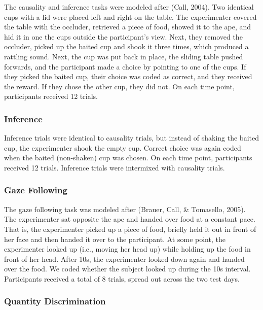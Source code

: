 \documentclass[10pt, letterpaper]{article}
\begin{document}
The causality and inference tasks were modeled after (Call, 2004). Two
identical cups with a lid were placed left and right on the table. The
experimenter covered the table with the occluder, retrieved a piece of
food, showed it to the ape, and hid it in one the cups outside the
participant's view. Next, they removed the occluder, picked up the
baited cup and shook it three times, which produced a rattling sound.
Next, the cup was put back in place, the sliding table pushed forwards,
and the participant made a choice by pointing to one of the cups. If
they picked the baited cup, their choice was coded as correct, and they
received the reward. If they chose the other cup, they did not. On each
time point, participants received 12 trials.

\hypertarget{inference}{%
\subsubsection{Inference}\label{inference}}

Inference trials were identical to causality trials, but instead of
shaking the baited cup, the experimenter shook the empty cup. Correct
choice was again coded when the baited (non-shaken) cup was chosen. On
each time point, participants received 12 trials. Inference trials were
intermixed with causality trials.

\hypertarget{gaze-following}{%
\subsubsection{Gaze Following}\label{gaze-following}}

The gaze following task was modeled after (Brauer, Call, \& Tomasello,
2005). The experimenter sat opposite the ape and handed over food at a
constant pace. That is, the experimenter picked up a piece of food,
briefly held it out in front of her face and then handed it over to the
participant. At some point, the experimenter looked up (i.e., moving her
head up) while holding up the food in front of her head. After 10s, the
experimenter looked down again and handed over the food. We coded
whether the subject looked up during the 10s interval. Participants
received a total of 8 trials, spread out across the two test days.

\hypertarget{quantity-discrimination}{%
\subsubsection{Quantity Discrimination}\label{quantity-discrimination}}
\end{document}
